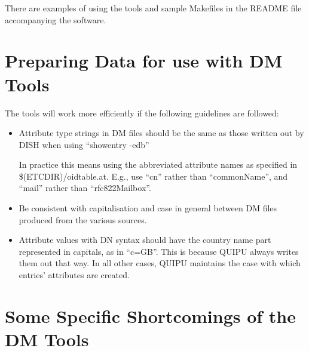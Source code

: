 There are examples of using the tools and sample Makefiles in the README
file accompanying the software.

\section{Preparing Data for use with DM Tools}

The tools will work more efficiently if the following guidelines are
followed:

\begin{itemize}
\item Attribute type strings in DM files should be the same as those
written out by DISH when using ``showentry -edb''

In practice this means using the abbreviated attribute names as specified in
\$(ETCDIR)/oidtable.at.  E.g., use ``cn'' rather than ``commonName'', and
``mail'' rather than ``rfc822Mailbox''.

\item Be consistent with capitalisation and case in general between DM files
produced from the various sources.

\item Attribute values with DN syntax should have the country name part
represented in capitals, as in ``c=GB''.  This is because QUIPU always
writes them out that way.  In all other cases, QUIPU maintains the case
with which entries' attributes are created.

\end{itemize}

\section{Some Specific Shortcomings of the DM Tools}

